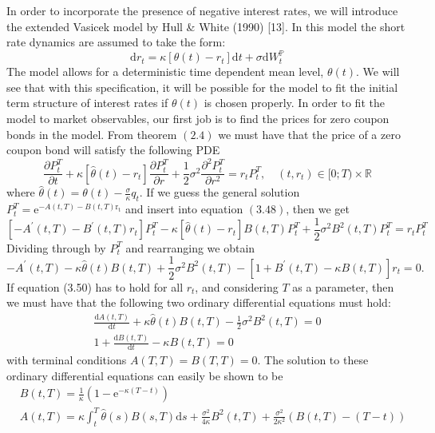 \documentclass[12pt,twoside]{reedthesis}
\begin{document}
In order to incorporate the presence of negative interest rates, we will introduce the extended Vasicek model by Hull \& White (1990) {[}13{]}. In this model the short rate dynamics are assumed to take the form:
\[
\mathrm{d} r_{t}=\kappa\left[\theta(t)-r_{t}\right] \mathrm{d} t+\sigma \mathrm{d} W_{t}^{\mathbb{P}}
\]
The model allows for a deterministic time dependent mean level, \(\theta(t)\). We will see that with this specification, it will be possible for the model to fit the initial term structure of interest rates if \(\theta(t)\) is chosen properly. In order to fit the model to market observables, our first job is to find the prices for zero coupon bonds in the model. From theorem \((2.4)\) we must have that the price of a zero coupon bond will satisfy the following PDE
\[
\frac{\partial P_{t}^{T}}{\partial t}+\kappa\left[\hat{\theta}(t)-r_{t}\right] \frac{\partial P_{t}^{T}}{\partial r}+\frac{1}{2} \sigma^{2} \frac{\partial^{2} P_{t}^{T}}{\partial r^{2}}=r_{t} P_{t}^{T}, \quad\left(t, r_{t}\right) \in[0 ; T) \times \mathbb{R}
\]
where \(\hat{\theta}(t)=\theta(t)-\frac{\sigma}{\kappa} q_{t}\). If we guess the general solution \(P_{t}^{T}=\mathrm{e}^{-A(t, T)-B(t, T) \mathrm{r}_{\mathrm{t}}}\) and insert into equation \((3.48)\), then we get
\[
\left[-A^{\prime}(t, T)-B^{\prime}(t, T) r_{t}\right] P_{t}^{T}-\kappa\left[\hat{\theta}(t)-r_{t}\right] B(t, T) P_{t}^{T}+\frac{1}{2} \sigma^{2} B^{2}(t, T) P_{t}^{T}=r_{t} P_{t}^{T}
\]
Dividing through by \(P_{t}^{T}\) and rearranging we obtain
\[
-A^{\prime}(t, T)-\kappa \hat{\theta}(t) B(t, T)+\frac{1}{2} \sigma^{2} B^{2}(t, T)-\left[1+B^{\prime}(t, T)-\kappa B(t, T)\right] r_{t}=0 .
\]
If equation (3.50) has to hold for all \(r_{t}\), and considering \(T\) as a parameter, then we must have that the following two ordinary differential equations must hold:
\[
\begin{array}{r}
\frac{\mathrm{d} A(t, T)}{\mathrm{d} t}+\kappa \hat{\theta}(t) B(t, T)-\frac{1}{2} \sigma^{2} B^{2}(t, T)=0 \\
1+\frac{\mathrm{d} B(t, T)}{\mathrm{d} t}-\kappa B(t, T)=0
\end{array}
\]
with terminal conditions \(A(T, T)=B(T, T)=0\). The solution to these ordinary differential equations can easily be shown to be
\[
\begin{aligned}
&B(t, T)=\frac{1}{\kappa}\left(1-\mathrm{e}^{-\kappa(T-t)}\right) \\
&A(t, T)=\kappa \int_{t}^{T} \hat{\theta}(s) B(s, T) \mathrm{d} s+\frac{\sigma^{2}}{4 \kappa} B^{2}(t, T)+\frac{\sigma^{2}}{2 \kappa^{2}}(B(t, T)-(T-t))
\end{aligned}
\]
\end{document}
